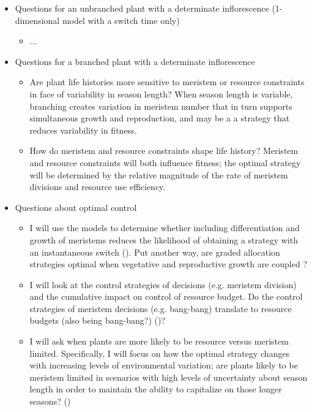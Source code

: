 \documentclass[12pt, oneside,titlepage]{article}   	%
\begin{document}
\singlespace
\begin{itemize}

\item Questions for an unbranched plant with a determinate inflorescence (1-dimensional model with a switch time only)
\begin{itemize}
\item ...
\end{itemize}

\item Questions for a branched plant with a determinate inflorescence
\begin{itemize}
\item Are plant life histories more sensitive to meristem or resource constraints in face of variability in season length? When season length is variable, branching creates variation in meristem number that in turn supports simultaneous growth and reproduction, and may be a a strategy that reduces variability in fitness. 
\item How do meristem and resource constraints shape life history? Meristem and resource constraints will both influence fitness; the optimal strategy will be determined by the relative magnitude of the rate of meristem divisions and resource use efficiency.
\end{itemize}

\item Questions about optimal control
\begin{itemize}
\item I will use the models to determine whether including differentiation and growth of meristems reduces the likelihood of obtaining a strategy with an instantaneous switch (\cite{cohen1971}). Put another way, are graded allocation strategies optimal when vegetative and reproductive growth are coupled \cite{fox1992a}? 
\item I will look at the control strategies of decisions (e.g. meristem division) and the cumulative impact on control of resource budget. Do the control strategies of meristem decisions (e.g. bang-bang) translate to resource budgets (also being bang-bang?) (\cite{fox1992a})? 
\item I will ask when plants are more likely to be resource versus meristem limited. Specifically, I will focus on how the optimal strategy changes with increasing levels of environmental variation; are plants likely to be meristem limited in scenarios with high levels of uncertainty about season length in order to maintain the ability to capitalize on those longer seasons? (\cite{wyatt1982,schemske1980,stebbins1974,salomonson1994})
\end{itemize}


\end{itemize}
\end{document}
